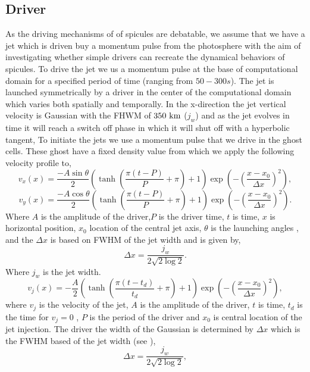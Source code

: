 \subsection{Driver}
\label{subsec:driver}
As the driving mechanisms of of spicules are debatable, we assume that we have a jet which is driven buy a momentum pulse from the photosphere with the aim of investigating whether simple drivers can recreate the dynamical behaviors of spicules.
To drive the jet we us a momentum pulse at the base of computational domain for a specified period of time (ranging from $50-300s$). The jet is launched symmetrically by a driver in the center of the computational domain which varies both spatially and temporally. In the x-direction the jet vertical velocity is Gaussian with the FHWM of $350 \ \rm{km}$ ($j_w$) and as the jet evolves in time it will reach a switch off phase in which it will shut off with a hyperbolic tangent,
To initiate the jets we use a momentum pulse that we drive in the ghost cells. These ghost have a fixed density value from which we apply the following velocity profile to,
\begin{equation}
    v_x(x) = \frac{-A\sin{\theta}}{2}\left( \tanh{\left( \frac{\pi (t-P)}{P}+ \pi \right) +1 } \right) \exp \left( - \left(\frac{x-x_0}{\Delta x} \right)^2  \right),
\end{equation}
\begin{equation}
    v_y(x) = \frac{-A\cos{\theta}}{2}\left( \tanh{\left( \frac{\pi (t-P)}{P}+ \pi \right) +1 } \right) \exp \left( - \left(\frac{x-x_0}{\Delta x} \right)^2  \right).
\end{equation}
Where $A$ is the amplitude of the driver,$P$ is the driver time, $t$ is time, $x$ is horizontal position, $x_0$ location of the central jet axis, $\theta$ is the launching angles , and the $\Delta x$ is based on FWHM of the jet width and is given by, 
\begin{equation}
\Delta x = \dfrac{j_w}{2 \sqrt{2 \log{2}}}.
\end{equation}
Where $j_w$ is the jet width.
\begin{equation}
v_{j}(x) = -\frac{A}{2} \left( \tanh \left( \frac{\pi (t-t_{d})}{t_d}+ \pi \right) +1 \right) \exp \left( - \left(\frac{x-x_0}{\Delta x} \right)^2  \right),
\end{equation}    
where $v_j$ is the velocity of the jet, $A$ is the amplitude of the driver, $t$ is time, $t_{d}$ is the time for $v_j=0$ , $P$ is the period of the driver and $x_0$ is central location of the jet injection. The driver the width of the Gaussian is determined by $\Delta x$ which is the FWHM based of the jet width (see ),
\begin{equation}
\Delta x = \dfrac{j_w}{2 \sqrt{2 \log{2}}},
\end{equation}  